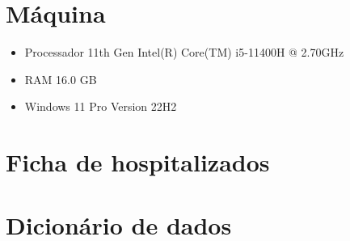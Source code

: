 \documentclass[espec,ppgcdbd]{destufba}
\begin{document}
%
%


    
    



    \appendix


    \chapter{Máquina}
    \label{ch:maquina}

    \begin{itemize}
        \item Processador 11th Gen Intel(R) Core(TM) i5-11400H @ 2.70GHz
        \item RAM 16.0 GB
        \item Windows 11 Pro Version 22H2
    \end{itemize}

    \annex


    \chapter{Ficha de hospitalizados}
    \label{ch:ficha-de-hospitalizados}

    


    \chapter{Dicionário de dados}
    \label{ch:dicionario-de-dados}

    

%
%
\end{document}
